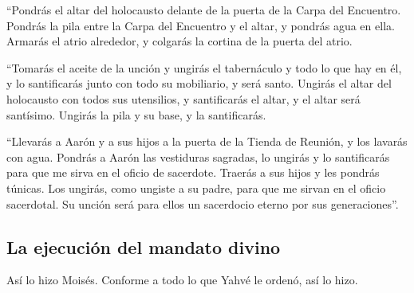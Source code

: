 \begin{paracol}{2}
 ``Pondrás el altar del holocausto delante de la puerta de
la Carpa del Encuentro.  Pondrás la pila entre la Carpa
del Encuentro y el altar, y pondrás agua en ella.  Armarás
el atrio alrededor, y colgarás la cortina de la puerta del atrio.

 ``Tomarás el aceite de la unción y ungirás el tabernáculo
y todo lo que hay en él, y lo santificarás junto con todo su mobiliario,
y será santo.  Ungirás el altar del holocausto con todos
sus utensilios, y santificarás el altar, y el altar será santísimo.
 Ungirás la pila y su base, y la santificarás.

 ``Llevarás a Aarón y a sus hijos a la puerta de la
Tienda de Reunión, y los lavarás con agua.  Pondrás a
Aarón las vestiduras sagradas, lo ungirás y lo santificarás para que me
sirva en el oficio de sacerdote.  Traerás a sus hijos y
les pondrás túnicas.  Los ungirás, como ungiste a su
padre, para que me sirvan en el oficio sacerdotal. Su unción será para
ellos un sacerdocio eterno por sus generaciones''.

\hypertarget{la-ejecuciuxf3n-del-mandato-divino}{%
\subsection{La ejecución del mandato
divino}\label{la-ejecuciuxf3n-del-mandato-divino}}

 Así lo hizo Moisés. Conforme a todo lo que Yahvé le
ordenó, así lo hizo.


\end{paracol}
